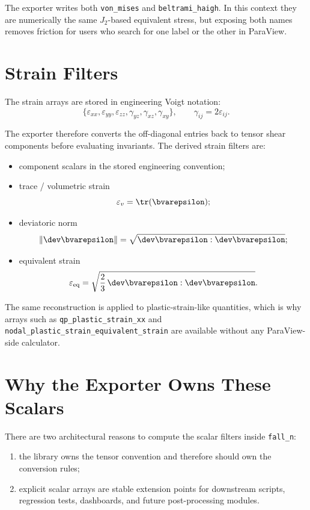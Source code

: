 The exporter writes both \texttt{von\_mises} and
\texttt{beltrami\_haigh}.  In this context they are numerically the same
$J_2$-based equivalent stress, but exposing both names removes friction for
users who search for one label or the other in ParaView.


\section{Strain Filters}
\label{sec:vtk_tensor_filters_strain}

The strain arrays are stored in engineering Voigt notation:
\[
  \{\varepsilon_{xx}, \varepsilon_{yy}, \varepsilon_{zz},
    \gamma_{yz}, \gamma_{xz}, \gamma_{xy}\},
  \qquad
  \gamma_{ij} = 2\varepsilon_{ij}.
\]

The exporter therefore converts the off-diagonal entries back to tensor shear
components before evaluating invariants.  The derived strain filters are:
\begin{itemize}[nosep]
  \item component scalars in the stored engineering convention;
  \item trace / volumetric strain
        \[
          \varepsilon_v = \tr(\bvarepsilon);
        \]
  \item deviatoric norm
        \[
          \|\dev \bvarepsilon\|
          =
          \sqrt{\dev \bvarepsilon : \dev \bvarepsilon};
        \]
  \item equivalent strain
        \[
          \varepsilon_{\mathrm{eq}}
          =
          \sqrt{\frac{2}{3}\,\dev \bvarepsilon : \dev \bvarepsilon}.
        \]
\end{itemize}

The same reconstruction is applied to plastic-strain-like quantities, which is
why arrays such as \texttt{qp\_plastic\_strain\_xx} and
\texttt{nodal\_plastic\_strain\_equivalent\_strain} are available without any
ParaView-side calculator.


\section{Why the Exporter Owns These Scalars}
\label{sec:vtk_tensor_filters_why}

There are two architectural reasons to compute the scalar filters inside
\texttt{fall\_n}:
\begin{enumerate}[nosep]
  \item the library owns the tensor convention and therefore should own the
        conversion rules;
  \item explicit scalar arrays are stable extension points for downstream
        scripts, regression tests, dashboards, and future post-processing
        modules.
\end{enumerate}

